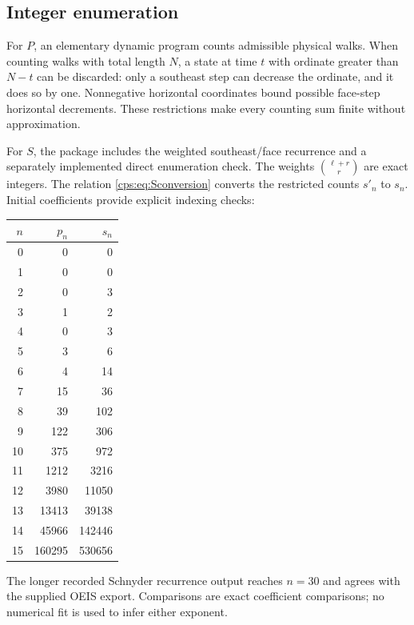 \documentclass[11pt,letterpaper]{article}
\numberwithin{equation}{section}
\theoremstyle{remark}\newtheorem{remark}[theorem]{Remark}
\begin{document}
\subsection{Integer enumeration}
For $P$, an elementary dynamic program counts admissible physical walks. When counting walks with total length $N$, a state at time $t$ with ordinate greater than $N-t$ can be discarded: only a southeast step can decrease the ordinate, and it does so by one. Nonnegative horizontal coordinates bound possible face-step horizontal decrements. These restrictions make every counting sum finite without approximation.

For $S$, the package includes the weighted southeast/face recurrence and a separately implemented direct enumeration check. The weights $\binom{\ell+r}{r}$ are exact integers. The relation \eqref{cps:eq:Sconversion} converts the restricted counts $s'_n$ to $s_n$. Initial coefficients provide explicit indexing checks:
\begin{center}
\begin{tabular}{@{}r*{2}{r}@{}}
\toprule
$n$&$p_n$&$s_n$\\
\midrule
0&0&0\\
1&0&0\\
2&0&3\\
3&1&2\\
4&0&3\\
5&3&6\\
6&4&14\\
7&15&36\\
8&39&102\\
9&122&306\\
10&375&972\\
11&1212&3216\\
12&3980&11050\\
13&13413&39138\\
14&45966&142446\\
15&160295&530656\\
\bottomrule
\end{tabular}
\end{center}
The longer recorded Schnyder recurrence output reaches $n=30$ and agrees with the supplied OEIS export. Comparisons are exact coefficient comparisons; no numerical fit is used to infer either exponent.
\end{document}
